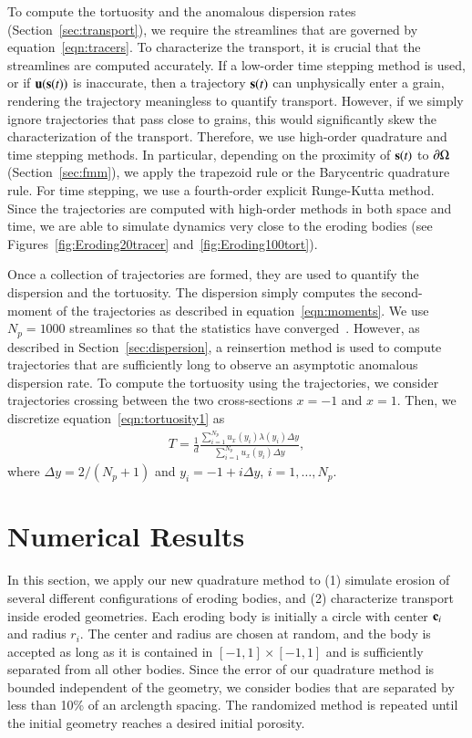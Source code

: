 \documentclass[preprint,10pt]{elsarticle}
\begin{document}
To compute the tortuosity and the anomalous dispersion rates
(Section~\ref{sec:transport}), we require the streamlines that are
governed by equation~\eqref{eqn:tracers}.  To characterize the
transport, it is crucial that the streamlines are computed accurately.
If a low-order time stepping method is used, or if $\uu(\ss(t))$ is
inaccurate, then a trajectory $\ss(t)$ can unphysically enter a grain,
rendering the trajectory meaningless to quantify transport.  However, if
we simply ignore trajectories that pass close to grains, this would
significantly skew the characterization of the transport. Therefore, we
use high-order quadrature and time stepping methods.  In particular,
depending on the proximity of $\ss(t)$ to $\bd\Omega$
(Section~\ref{sec:fmm}), we apply the trapezoid rule or the Barycentric
quadrature rule.  For time stepping, we use a fourth-order explicit
Runge-Kutta method.  Since the trajectories are computed with high-order
methods in both space and time,  we are able to simulate dynamics very
close to the eroding bodies (see Figures~\ref{fig:Eroding20tracer}
and~\ref{fig:Eroding100tort}).

Once a collection of trajectories are formed, they are used to quantify
the dispersion and the tortuosity.  The dispersion simply computes the
second-moment of the trajectories as described in
equation~\eqref{eqn:moments}.  We use $N_p = 1000$ streamlines so that
the statistics have converged~\cite{bel-sal-rin1992}.  However, as
described in Section~\ref{sec:dispersion}, a reinsertion method is used
to compute trajectories that are sufficiently long to observe an
asymptotic anomalous dispersion rate.  To compute the tortuosity using
the trajectories, we consider trajectories crossing between the two
cross-sections $x=-1$ and $x=1$.  Then, we discretize
equation~\eqref{eqn:tortuosity1} as
\begin{align}
  T = \frac{1}{d}\frac{\displaystyle\sum_{i=1}^{N_p} 
    u_x(y_i) \lambda(y_i) \Delta y}
  {\displaystyle\sum_{i=1}^{N_p} u_x(y_i) \Delta y}, 
\end{align}
where $\Delta y = 2/(N_p + 1)$ and $y_i = -1 + i \Delta y$,
$i=1,\ldots,N_p$.  

\section{Numerical Results}
\label{sec:results}
In this section, we apply our new quadrature method to (1) simulate
erosion of several different configurations of eroding bodies, and (2)
characterize transport inside eroded geometries.  Each eroding body is
initially a circle with center $\cc_i$ and radius $r_i$.  The center and
radius are chosen at random, and the body is accepted as long as it is
contained in $[-1,1] \times [-1,1]$ and is sufficiently separated from
all other bodies.  Since the error of our quadrature method is bounded
independent of the geometry, we consider bodies that are separated by
less than 10\% of an arclength spacing.  The randomized method is
repeated until the initial geometry reaches a desired initial porosity.
\end{document}
